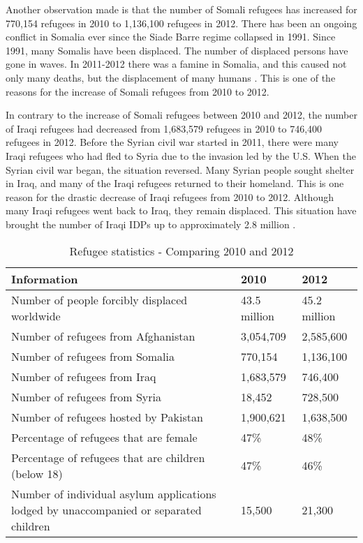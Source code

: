 Another observation made is that the number of Somali refugees has increased for 770,154 refugees in 2010 to 1,136,100 refugees in 2012. There has been an ongoing conflict in Somalia ever since the Siade Barre regime collapsed in 1991. Since 1991, many Somalis have been displaced. The number of displaced persons have gone in waves. In 2011-2012 there was a famine in Somalia, and this caused not only many deaths, but the displacement of many humans \cite{somalia}. This is one of the reasons for the increase of Somali refugees from 2010 to 2012. 

In contrary to the increase of Somali refugees between 2010 and 2012, the number of Iraqi refugees had decreased from 1,683,579 refugees in 2010 to 746,400 refugees in 2012. Before the Syrian civil war started in 2011, there were many Iraqi refugees who had fled to Syria due to the invasion led by the U.S. When the Syrian civil war began, the situation reversed. Many Syrian people sought shelter in Iraq, and many of the Iraqi refugees returned to their homeland. This is one reason for the drastic decrease of Iraqi refugees from 2010 to 2012. Although many Iraqi refugees went back to Iraq, they remain displaced. This situation have brought the number of Iraqi IDPs up to approximately 2.8 million \citep{iraq}. 

\begin{center}
\begin{table}[!ht]
\caption{\label{tab:refugeestatistics}Refugee statistics - Comparing 2010 and 2012 \cite{UNHCRstat2010,UNHCRstat2012}}
    \begin{tabular}{ | p{8cm} | l | l |}
    \hline
    \textbf{Information} & \textbf{2010} & \textbf{2012} \\ 
    \hline
    Number of people forcibly displaced worldwide & 43.5 million & 45.2 million  \\ 
    \hline
    
    Number of refugees from Afghanistan & 3,054,709 & 2,585,600 \\ 
    \hline
    Number of refugees from Somalia & 770,154 & 1,136,100 \\ 
    \hline
    Number of refugees from Iraq & 1,683,579 & 746,400 \\ 
    \hline
     Number of refugees from Syria & 18,452 & 728,500 \\ 
    \hline
    Number of refugees hosted by Pakistan & 1,900,621 & 1,638,500 \\
    \hline
    Percentage of refugees that are female & 47\% & 48\% \\
	\hline
	Percentage of refugees that are children (below 18) & 47\% & 46\% \\
	\hline
	Number of individual asylum applications lodged by unaccompanied or separated children & 15,500 & 21,300 \\
	\hline
    \end{tabular}
   \end{table}
\end{center}


